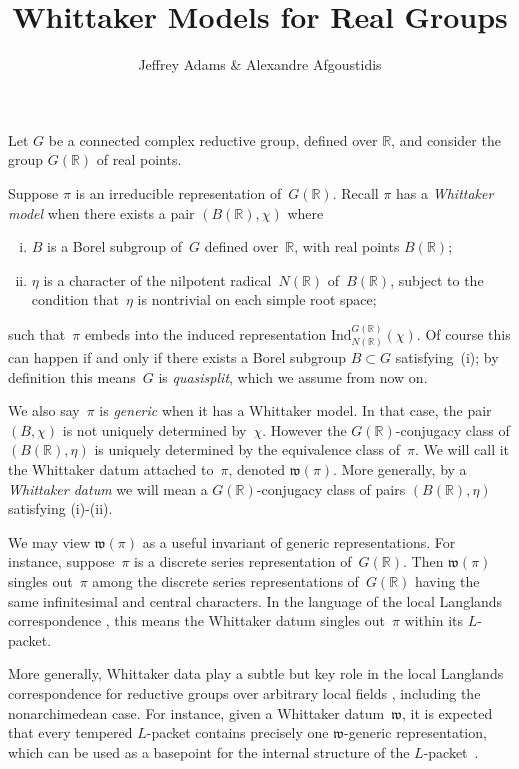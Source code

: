 \documentclass[10pt,leqno]{article}
\newcommand{\R}{\mathbb R}
\begin{document}
\title{Whittaker Models for Real Groups}
\author{Jeffrey Adams \& Alexandre Afgoustidis}
\maketitle

Let $G$ be a connected complex reductive group, defined over $\R$, and consider the group $G(\R)$ of real points. 

Suppose $\pi$ is an irreducible representation of~$G(\R)$. Recall $\pi$ has a \emph{Whittaker model} when there exists a pair $(B(\R), \chi)$ where 
\begin{enumerate}[(i)]
\item $B$ is a Borel subgroup of~$G$ defined over~$\R$, with real points $B(\R)$;
\item $\eta$ is a character of the nilpotent radical~$N(\R)$ of~$B(\R)$, subject to the condition that~$\eta$ is nontrivial on each simple root space;
\end{enumerate}
such that~$\pi$ embeds into the induced representation $\mathrm{Ind}_{N(\R)}^{G(\R)}(\chi)$. Of course this can happen if and only if there exists a Borel subgroup $B \subset G$ satisfying~(i); by definition this means~$G$ is \emph{quasisplit}, which we assume from now on. 

We also say~$\pi$ is \emph{generic} when it has a Whittaker model. In that case, the pair $(B, \chi)$ is not uniquely determined by~$\chi$. However the $G(\R)$-conjugacy class of $(B(\R), \eta)$ is uniquely determined by the equivalence class of~$\pi$. We will call it the Whittaker datum attached to~$\pi$, denoted $\mathfrak{w}(\pi)$. More generally, by a  {\it Whittaker datum} we will mean a $G(\R)$-conjugacy class of pairs  $(B(\R),\eta)$ satisfying (i)-(ii). 

We may view $\mathfrak{w}(\pi)$ as a useful invariant of generic representations. For instance, suppose~$\pi$ is a discrete series representation of~$G(\R)$. Then $\mathfrak{w}(\pi)$ singles out~$\pi$ among the discrete series representations of~$G(\R)$ having  the same infinitesimal and central characters. In the language of the local Langlands correspondence \cite{Langlands_CIRRAC, Contragredient}, this means the Whittaker datum singles out~$\pi$ within its $L$-packet. 

More generally, Whittaker data play a subtle but key role in the local Langlands correspondence for reductive groups over arbitrary local fields \cite{Borel, Kaletha_Taibi}, including the nonarchimedean case. For instance, given a Whittaker datum~$\mathfrak{w}$, it is expected that every tempered $L$-packet contains precisely one $\mathfrak{w}$-generic representation, which can be used as a basepoint for the internal structure of the $L$-packet~\cite{Kaletha_genericity}.
\end{document}
